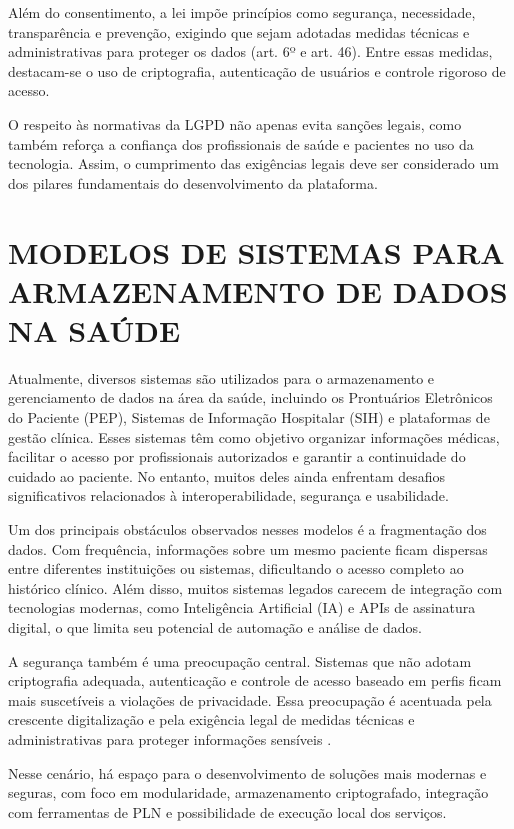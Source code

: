 Além do consentimento, a lei impõe princípios como segurança, necessidade, transparência e prevenção, exigindo que sejam adotadas medidas técnicas e administrativas para proteger os dados (art. 6º e art. 46). Entre essas medidas, destacam-se o uso de criptografia, autenticação de usuários e controle rigoroso de acesso.

O respeito às normativas da LGPD não apenas evita sanções legais, como também reforça a confiança dos profissionais de saúde e pacientes no uso da tecnologia. Assim, o cumprimento das exigências legais deve ser considerado um dos pilares fundamentais do desenvolvimento da plataforma.

\section{MODELOS DE SISTEMAS PARA ARMAZENAMENTO DE DADOS NA SAÚDE}

Atualmente, diversos sistemas são utilizados para o armazenamento e gerenciamento de dados na área da saúde, incluindo os Prontuários Eletrônicos do Paciente (PEP), Sistemas de Informação Hospitalar (SIH) e plataformas de gestão clínica. Esses sistemas têm como objetivo organizar informações médicas, facilitar o acesso por profissionais autorizados e garantir a continuidade do cuidado ao paciente. No entanto, muitos deles ainda enfrentam desafios significativos relacionados à interoperabilidade, segurança e usabilidade.

Um dos principais obstáculos observados nesses modelos é a fragmentação dos dados. Com frequência, informações sobre um mesmo paciente ficam dispersas entre diferentes instituições ou sistemas, dificultando o acesso completo ao histórico clínico. Além disso, muitos sistemas legados carecem de integração com tecnologias modernas, como Inteligência Artificial (IA) e APIs de assinatura digital, o que limita seu potencial de automação e análise de dados.

A segurança também é uma preocupação central. Sistemas que não adotam criptografia adequada, autenticação e controle de acesso baseado em perfis ficam mais suscetíveis a violações de privacidade. Essa preocupação é acentuada pela crescente digitalização e pela exigência legal de medidas técnicas e administrativas para proteger informações sensíveis \cite{brasil2018lei}.

Nesse cenário, há espaço para o desenvolvimento de soluções mais modernas e seguras, com foco em modularidade, armazenamento criptografado, integração com ferramentas de PLN e possibilidade de execução local dos serviços.

